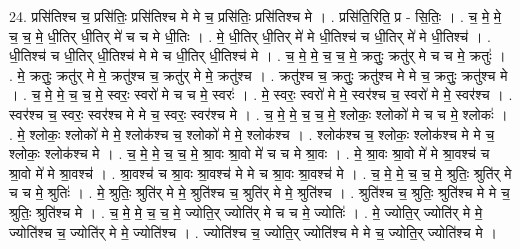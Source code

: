 \documentclass[17pt]{extarticle}
\begin{document}
24. प्रसि॑तिश्च च॒ प्रसि॑तिः॒ प्रसि॑तिश्च मे मे च॒ प्रसि॑तिः॒ प्रसि॑तिश्च मे । . प्रसि॑ति॒रिति॒ प्र - सि॒तिः॒ । . च॒ मे॒ मे॒ च॒ च॒ मे॒ धी॒तिर् धी॒तिर् मे॑ च च मे धी॒तिः । . मे॒ धी॒तिर् धी॒तिर् मे॑ मे धी॒तिश्च॑ च धी॒तिर् मे॑ मे धी॒तिश्च॑ । . धी॒तिश्च॑ च धी॒तिर् धी॒तिश्च॑ मे मे च धी॒तिर् धी॒तिश्च॑ मे । . च॒ मे॒ मे॒ च॒ च॒ मे॒ क्रतुः॒ क्रतु॑र् मे च च मे॒ क्रतुः॑ । . मे॒ क्रतुः॒ क्रतु॑र् मे मे॒ क्रतु॑श्च च॒ क्रतु॑र् मे मे॒ क्रतु॑श्च । . क्रतु॑श्च च॒ क्रतुः॒ क्रतु॑श्च मे मे च॒ क्रतुः॒ क्रतु॑श्च मे । . च॒ मे॒ मे॒ च॒ च॒ मे॒ स्वरः॒ स्वरो॑ मे च च मे॒ स्वरः॑ । . मे॒ स्वरः॒ स्वरो॑ मे मे॒ स्वर॑श्च च॒ स्वरो॑ मे मे॒ स्वर॑श्च । . स्वर॑श्च च॒ स्वरः॒ स्वर॑श्च मे मे च॒ स्वरः॒ स्वर॑श्च मे । . च॒ मे॒ मे॒ च॒ च॒ मे॒ श्लोकः॒ श्लोको॑ मे च च मे॒ श्लोकः॑ । . मे॒ श्लोकः॒ श्लोको॑ मे मे॒ श्लोक॑श्च च॒ श्लोको॑ मे मे॒ श्लोक॑श्च । . श्लोक॑श्च च॒ श्लोकः॒ श्लोक॑श्च मे मे च॒ श्लोकः॒ श्लोक॑श्च मे । . च॒ मे॒ मे॒ च॒ च॒ मे॒ श्रा॒वः श्रा॒वो मे॑ च च मे श्रा॒वः । . मे॒ श्रा॒वः श्रा॒वो मे॑ मे श्रा॒वश्च॑ च श्रा॒वो मे॑ मे श्रा॒वश्च॑ । . श्रा॒वश्च॑ च श्रा॒वः श्रा॒वश्च॑ मे मे च श्रा॒वः श्रा॒वश्च॑ मे । . च॒ मे॒ मे॒ च॒ च॒ मे॒ श्रुतिः॒ श्रुति॑र् मे च च मे॒ श्रुतिः॑ । . मे॒ श्रुतिः॒ श्रुति॑र् मे मे॒ श्रुति॑श्च च॒ श्रुति॑र् मे मे॒ श्रुति॑श्च । . श्रुति॑श्च च॒ श्रुतिः॒ श्रुति॑श्च मे मे च॒ श्रुतिः॒ श्रुति॑श्च मे । . च॒ मे॒ मे॒ च॒ च॒ मे॒ ज्योति॒र् ज्योति॑र् मे च च मे॒ ज्योतिः॑ । . मे॒ ज्योति॒र् ज्योति॑र् मे मे॒ ज्योति॑श्च च॒ ज्योति॑र् मे मे॒ ज्योति॑श्च । . ज्योति॑श्च च॒ ज्योति॒र् ज्योति॑श्च मे मे च॒ ज्योति॒र् ज्योति॑श्च मे । \newline
\end{document}
